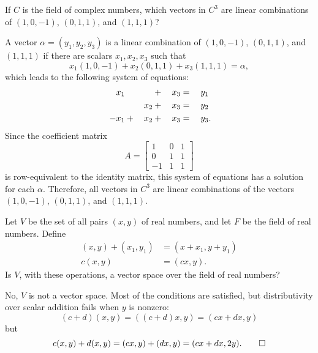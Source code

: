  If $C$ is the field of complex numbers, which vectors in
$C^3$ are linear combinations of $(1,0,-1)$, $(0,1,1)$, and $(1,1,1)$?
\begin{solution}
  A vector $\alpha = (y_1,y_2,y_3)$ is a linear combination of
  $(1,0,-1)$, $(0,1,1)$, and $(1,1,1)$ if there are scalars
  $x_1,x_2,x_3$ such that
  \begin{equation*}
    x_1(1, 0, -1) + x_2(0, 1, 1) + x_3(1, 1, 1) = \alpha,
  \end{equation*}
  which leads to the following system of equations:
  \begin{alignat*}{4}
    \phantom{{}-}x_1 &&  &{}+{}& x_3 &{}={}& y_1 \\
    && x_2 &{}+{}& x_3 &{}={}& y_2 \\
    -x_1 &{}+{}& x_2 &{}+{}& x_3 &{}={}& y_3\rlap.
  \end{alignat*}
  Since the coefficient matrix
  \begin{equation*}
    A =
    \begin{bmatrix}
      1 & 0 & 1 \\
      0 & 1 & 1 \\
      -1 & 1 & 1
    \end{bmatrix}
  \end{equation*}
  is row-equivalent to the identity matrix, this system of equations
  has a solution for each $\alpha$. Therefore, all vectors in $C^3$
  are linear combinations of the vectors $(1,0,-1)$, $(0,1,1)$, and
  $(1,1,1)$.
\end{solution}

 Let $V$ be the set of all pairs $(x,y)$ of real numbers,
and let $F$ be the field of real numbers. Define
\begin{align*}
  (x,y) + (x_1,y_1) &= (x + x_1, y + y_1) \\
  c(x,y) &= (cx,y).
\end{align*}
Is $V$, with these operations, a vector space over the field of real
numbers?
\begin{solution}
  No, $V$ is not a vector space. Most of the conditions are satisfied,
  but distributivity over scalar addition fails when $y$ is nonzero:
  \begin{equation*}
    (c + d)(x,y) = ((c + d)x, y) = (cx + dx, y)
  \end{equation*}
  but
  \begin{equation*}
    c(x,y) + d(x,y) = (cx, y) + (dx,y) = (cx + dx, 2y). \qedhere
  \end{equation*}
\end{solution}
